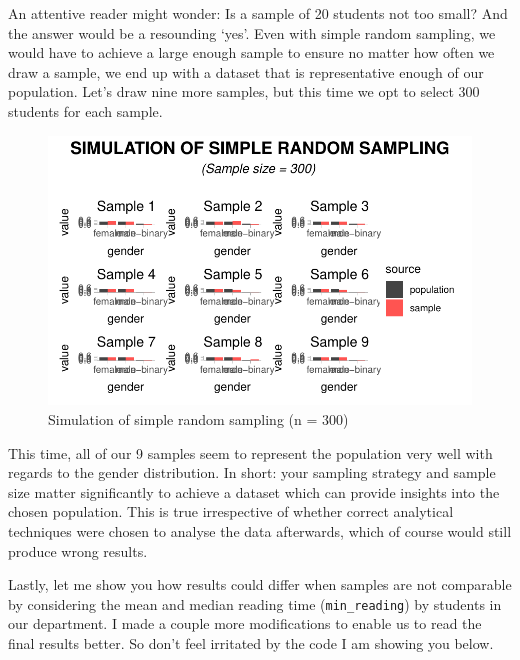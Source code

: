 \documentclass[
  letterpaper,
]{krantz}
\begin{document}
An attentive reader might wonder: Is a sample of 20 students not too
small? And the answer would be a resounding `yes'. Even with simple
random sampling, we would have to achieve a large enough sample to
ensure no matter how often we draw a sample, we end up with a dataset
that is representative enough of our population. Let's draw nine more
samples, but this time we opt to select 300 students for each sample.

\begin{figure}[H]

{\centering \includegraphics{09_sources_of_bias_files/figure-latex/drawing-samples-of-300-1.pdf}

}

\caption{Simulation of simple random sampling (n = 300)}

\end{figure}%

This time, all of our 9 samples seem to represent the population very
well with regards to the gender distribution. In short: your sampling
strategy and sample size matter significantly to achieve a dataset which
can provide insights into the chosen population. This is true
irrespective of whether correct analytical techniques were chosen to
analyse the data afterwards, which of course would still produce wrong
results.

Lastly, let me show you how results could differ when samples are not
comparable by considering the mean and median reading time
(\texttt{min\_reading}) by students in our department. I made a couple
more modifications to enable us to read the final results better. So
don't feel irritated by the code I am showing you below.
\end{document}
